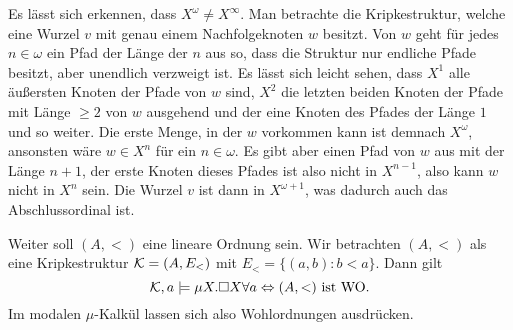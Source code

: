 \begin{example}
\begin{enumerate}
	Es lässt sich erkennen, dass $X^\omega\neq X^\infty$. Man betrachte die Kripkestruktur, welche eine Wurzel $v$ mit genau einem Nachfolgeknoten $w$ besitzt. Von $w$ geht für jedes $n\in\omega$ ein Pfad der Länge der $n$ aus so, dass die Struktur nur endliche Pfade besitzt, aber unendlich verzweigt ist. 
	Es lässt sich leicht sehen, dass $X^1$ alle äußersten Knoten der Pfade von $w$ sind, $X^2$ die letzten beiden Knoten der Pfade mit Länge $\geq 2$ von $w$ ausgehend und der eine Knoten des Pfades der Länge $1$ und so weiter. Die erste Menge, in der $w$ vorkommen kann ist demnach $X^\omega$, ansonsten wäre $w\in X^n$ für ein $n\in \omega$. Es gibt aber einen Pfad von $w$ aus mit der Länge $n+1$, der erste Knoten dieses Pfades ist also nicht in $X^{n-1}$, also kann $w$ nicht in $X^n$ sein. 
	Die Wurzel $v$ ist dann in $X^{\omega+1}$, was dadurch auch das Abschlussordinal ist.
	
	Weiter soll $(A,<)$ eine lineare Ordnung sein. Wir betrachten $(A,<)$ als eine Kripkestruktur $\mathcal{K}=(A,E_<)$ mit $E_<=\{(a,b): b < a\}$. Dann gilt $$\mathcal{K},a\models \mu X.\square X \forall a \Leftrightarrow (A,<) \text{ ist WO}.$$ Im modalen $\mu$-Kalkül lassen sich also Wohlordnungen ausdrücken.
	

\end{enumerate}
\end{example}
